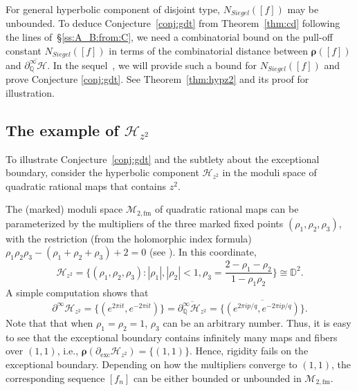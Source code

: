 \documentclass[11pt, reqno]{amsart}
\numberwithin{equation}{section}
\theoremstyle{plain}
\theoremstyle{theorem}
\theoremstyle{plain}
\theoremstyle{definition}
\newcommand{\Q}{\mathbb{Q}}
\newcommand{\D}{\mathbb{D}}
\newcommand{\fm}{\text{fm}}
\numberwithin{figure}{section}
\begin{document}
For general hyperbolic component of disjoint type, $N_{Siegel}([f])$ may be unbounded. To deduce Conjecture~\ref{conj:gdt} from Theorem~\ref{thm:cd} following the lines of~\S\ref{ss:A_B:from:C}, we need a combinatorial bound on the pull-off constant $N_{Siegel}([f])$ in terms of the combinatorial distance between $\boldsymbol{\rho}([f])$ and $\overline{\partial^\infty_\Q \mathcal{H}}$. In the sequel~\cite{DLuo}, we will provide such a bound for $N_{Siegel}([f])$ and prove Conjecture \ref{conj:gdt}. See Theorem~\ref{thm:hypz2} and its proof for illustration.



\subsection{The example of $\mathcal{H}_{z^2}$}\label{ss:intro:z^2}
To illustrate Conjecture~\ref{conj:gdt} and the subtlety about the exceptional boundary, consider the hyperbolic component $\mathcal{H}_{z^2}$ in the moduli space of quadratic rational maps that contains $z^2$. 




The (marked) moduli space $\mathcal{M}_{2, \fm}$ of quadratic rational maps can be parameterized by the multipliers of the three marked fixed points $(\rho_1, \rho_2, \rho_3)$, with the restriction (from the holomorphic index formula) $\rho_1\rho_2\rho_3 - (\rho_1 + \rho_2 + \rho_3) + 2 = 0$ (see \cite{Mil93}).
In this coordinate,
$$
\mathcal{H}_{z^2} = \{(\rho_1, \rho_2, \rho_3): |\rho_1|, |\rho_2| < 1, \rho_3 = \frac{2-\rho_1-\rho_2}{1-\rho_1\rho_2}\} \cong \D^2.
$$
A simple computation shows that 
$$
\partial^\infty \mathcal{H}_{z^2} = \{(e^{2\pi i t}, e^{-2\pi i t})\} = \overline{\partial^\infty_\Q \mathcal{H}_{z^2}} = \overline{\{(e^{2\pi i p/q}, e^{-2\pi i p/q})\}}.
$$
Note that that when $\rho_1 = \rho_2 = 1$, $\rho_3$ can be an arbitrary number.
Thus, it is easy to see that the exceptional boundary contains infinitely many maps and fibers over $(1,1)$, i.e.,
$\boldsymbol{\rho}(\partial_{\operatorname{exc}}\mathcal{H}_{z^2}) = \{(1, 1)\}$.
Hence, rigidity fails on the exceptional boundary.
Depending on how the multipliers converge to $(1, 1)$, the corresponding sequence $[f_n]$ can be either bounded or unbounded in $\mathcal{M}_{2, \fm}$.
\end{document}
